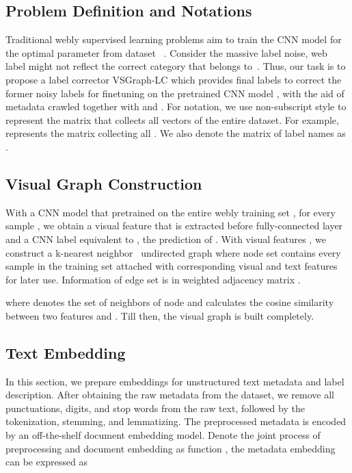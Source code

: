 \documentclass[sigconf]{acmart}
\begin{document}
\subsection{Problem Definition and Notations}
\label{S:problem}
Traditional webly supervised learning problems aim to train the CNN model  for the optimal parameter  from dataset ~\cite{li2017webvision}.
Consider the massive label noise, web label  might not reflect the correct category that  belongs to~\cite{xiao2015learning}.
Thus, our task is to propose a label corrector VSGraph-LC which provides final labels  to correct the former noisy labels  for finetuning on the pretrained CNN model , with the aid of metadata  crawled together with  and .
For notation, we use non-subscript style to represent the matrix that collects all vectors of the entire dataset. For example,  represents the matrix collecting all .
We also denote the matrix of label names as .

\subsection{Visual Graph Construction}
With a CNN model  that pretrained on the entire webly training set , for every sample , we obtain a visual feature  that is extracted before fully-connected layer and a CNN label  equivalent to , the prediction of . With visual features , we construct a k-nearest neighbor~\cite{dudani1976distance} undirected graph  where node set  contains every sample in the training set attached with corresponding visual and text features for later use. Information of edge set  is in weighted adjacency matrix .

where  denotes the set of  neighbors of node  and  calculates the cosine similarity between two features  and . Till then, the visual graph is built completely.
	
\subsection{Text Embedding}
\label{S:metadata}
In this section, we prepare embeddings for unstructured text metadata and label description. After obtaining the raw metadata  from the dataset, we remove all punctuations, digits, and stop words from the raw text, followed by the tokenization, stemming, and lemmatizing. The preprocessed metadata is encoded by an off-the-shelf document embedding model. Denote the joint process of preprocessing and document embedding as function , the metadata embedding  can be expressed as
\end{document}
